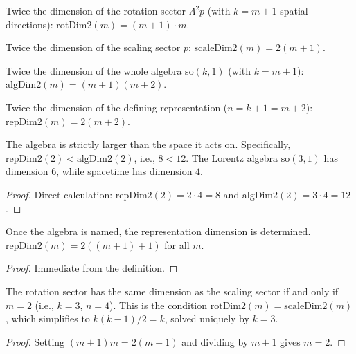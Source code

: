 \begin{definition}
Twice the dimension of the rotation sector $\Lambda^2 p$ (with $k = m+1$ spatial directions):
$\text{rotDim2}(m) = (m+1) \cdot m$.
\end{definition}

\begin{definition}
Twice the dimension of the scaling sector $p$:
$\text{scaleDim2}(m) = 2(m+1)$.
\end{definition}

\begin{definition}
Twice the dimension of the whole algebra $\mathrm{so}(k, 1)$ (with $k = m+1$):
$\text{algDim2}(m) = (m+1)(m+2)$.
\end{definition}

\begin{definition}
Twice the dimension of the defining representation ($n = k + 1 = m + 2$):
$\text{repDim2}(m) = 2(m+2)$.
\end{definition}

\begin{theorem}
The algebra is strictly larger than the space it acts on. Specifically,
$\text{repDim2}(2) < \text{algDim2}(2)$, i.e., $8 < 12$. The Lorentz algebra $\mathrm{so}(3,1)$
has dimension $6$, while spacetime has dimension $4$.
\end{theorem}
\begin{proof}
Direct calculation: $\text{repDim2}(2) = 2 \cdot 4 = 8$ and $\text{algDim2}(2) = 3 \cdot 4 = 12$.
\end{proof}

\begin{theorem}
Once the algebra is named, the representation dimension is determined. $\text{repDim2}(m) = 2((m+1) + 1)$ for all $m$.
\end{theorem}
\begin{proof}
Immediate from the definition.
\end{proof}

\begin{theorem}
The rotation sector has the same dimension as the scaling sector if and only if $m = 2$
(i.e., $k = 3$, $n = 4$). This is the condition $\text{rotDim2}(m) = \text{scaleDim2}(m)$,
which simplifies to $k(k-1)/2 = k$, solved uniquely by $k = 3$.
\end{theorem}
\begin{proof}
Setting $(m+1)m = 2(m+1)$ and dividing by $m+1$ gives $m = 2$.
\end{proof}

